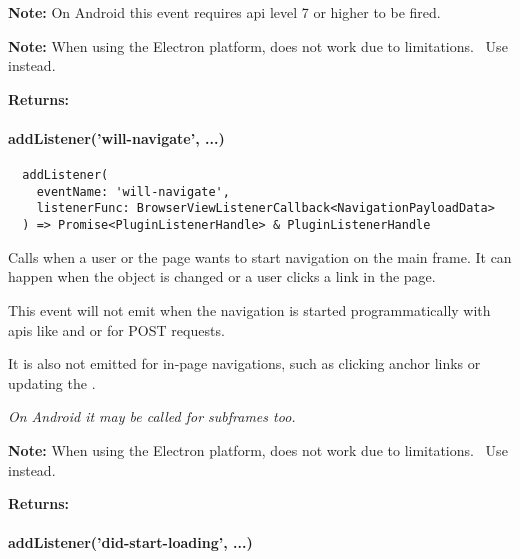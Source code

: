 \textbf{Note:} On Android this event requires \ac{api} level 7 or higher to be fired.~\cite{android:api}

\textbf{Note:} When using the Electron platform,  does not work due to limitations.~\cite{capacitor-electron}
Use  instead.

\textbf{Returns:} 



\paragraph{addListener('will-navigate', ...)}

\begin{verbatim}
  addListener(
    eventName: 'will-navigate',
    listenerFunc: BrowserViewListenerCallback<NavigationPayloadData>
  ) => Promise<PluginListenerHandle> & PluginListenerHandle
\end{verbatim}

Calls  when a user or the page wants to start navigation on the main frame.
It can happen when the  object is changed or a user clicks a link in the page.

This event will not emit when the navigation is started programmatically with \acsp{api}
like  and  or for POST requests.

It is also not emitted for in-page navigations, such as clicking anchor links or
updating the .

\textit{On Android it may be called for subframes too.~\cite{android:api}}

\textbf{Note:} When using the Electron platform,  does not work due to limitations.~\cite{capacitor-electron}
Use  instead.

\textbf{Returns:} 


\newpage

\paragraph{addListener('did-start-loading', ...)}

